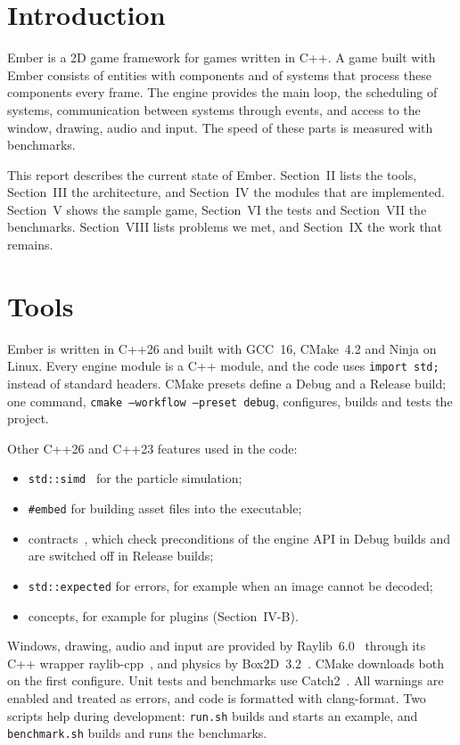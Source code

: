 \documentclass[conference]{IEEEtran}
\newcommand{\code}[1]{\texttt{#1}}
\begin{document}
\section{Introduction}

Ember is a 2D game framework for games written in C++. A game built with Ember consists of
entities with components and of systems that process these components every frame. The
engine provides the main loop, the scheduling of systems, communication between systems
through events, and access to the window, drawing, audio and input. The speed of these
parts is measured with benchmarks.

This report describes the current state of Ember. Section~II lists the tools,
Section~III the architecture, and Section~IV the modules that are implemented. Section~V shows the sample game, Section~VI the tests and Section~VII the
benchmarks. Section~VIII lists problems we met, and Section~IX the work that remains.

\section{Tools}

Ember is written in C++26 and built with GCC~16, CMake~4.2 and Ninja on Linux. Every engine
module is a C++ module, and the code uses \code{import std;} instead of standard headers.
CMake presets define a Debug and a Release build; one command,
\code{cmake --workflow --preset debug}, configures, builds and tests the project.

Other C++26 and C++23 features used in the code:
\begin{itemize}
    \item \code{std::simd}~\cite{simd} for the particle simulation;
    \item \code{\#embed} for building asset files into the executable;
    \item contracts~\cite{contracts}, which check preconditions of the engine API in Debug
          builds and are switched off in Release builds;
    \item \code{std::expected} for errors, for example when an image cannot be decoded;
    \item concepts, for example for plugins (Section~IV-B).
\end{itemize}

Windows, drawing, audio and input are provided by Raylib~6.0~\cite{raylib} through its
C++ wrapper raylib-cpp~\cite{raylibcpp}, and physics by Box2D~3.2~\cite{box2d}. CMake
downloads both on the first configure. Unit tests and benchmarks use Catch2~\cite{catch2}.
All warnings are enabled and treated as errors, and code is formatted with clang-format.
Two scripts help during development: \code{run.sh} builds and starts an example, and
\code{benchmark.sh} builds and runs the benchmarks.
\end{document}
